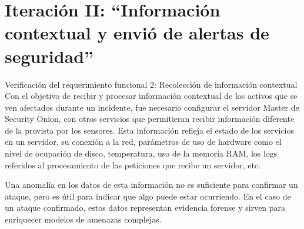 \chapter{Iteración II: “Información contextual y envió de alertas de seguridad”}
\begin{section}{Verificación del requerimiento funcional 2: Recolección de información contextual}
    Con el objetivo de recibir y procesar información contextual de los activos que se ven afectados durante un incidente, fue necesario configurar el servidor Master de Security Onion, con otros servicios que permitieran recibir información diferente de la provista por los sensores. Esta información refleja el estado de los servicios en un servidor, su conexión a la red, parámetros de uso de hardware como el nivel de ocupación de disco, temperatura, uso de la memoria RAM, los logs referidos al procesamiento de las peticiones que recibe un servidor, etc. \par
    Una anomalía en los datos de esta información no es suficiente para confirmar un ataque, pero es útil para indicar que algo puede estar ocurriendo. En el caso de un ataque confirmado, estos datos representan evidencia forense y sirven para enriquecer modelos de amenazas complejas. \par
   

\end{section}
